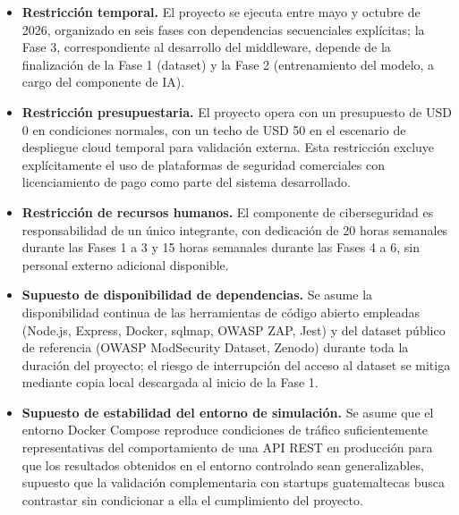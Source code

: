 \begin{itemize}
    \item \textbf{Restricción temporal.} El proyecto se ejecuta entre mayo y octubre de 2026,
    organizado en seis fases con dependencias secuenciales explícitas; la Fase 3, correspondiente
    al desarrollo del middleware, depende de la finalización de la Fase 1 (dataset) y la Fase 2
    (entrenamiento del modelo, a cargo del componente de IA).
    \item \textbf{Restricción presupuestaria.} El proyecto opera con un presupuesto de USD 0 en
    condiciones normales, con un techo de USD 50 en el escenario de despliegue cloud temporal
    para validación externa. Esta restricción excluye explícitamente el uso de plataformas de
    seguridad comerciales con licenciamiento de pago como parte del sistema desarrollado.
    \item \textbf{Restricción de recursos humanos.} El componente de ciberseguridad es
    responsabilidad de un único integrante, con dedicación de 20 horas semanales durante las
    Fases 1 a 3 y 15 horas semanales durante las Fases 4 a 6, sin personal externo adicional
    disponible.
    \item \textbf{Supuesto de disponibilidad de dependencias.} Se asume la disponibilidad
    continua de las herramientas de código abierto empleadas (Node.js, Express, Docker,
    sqlmap, OWASP ZAP, Jest) y del dataset público de referencia (OWASP ModSecurity Dataset,
    Zenodo) durante toda la duración del proyecto; el riesgo de interrupción del acceso al
    dataset se mitiga mediante copia local descargada al inicio de la Fase 1.
    \item \textbf{Supuesto de estabilidad del entorno de simulación.} Se asume que el entorno
    Docker Compose reproduce condiciones de tráfico suficientemente representativas del
    comportamiento de una API REST en producción para que los resultados obtenidos en el
    entorno controlado sean generalizables, supuesto que la validación complementaria con
    startups guatemaltecas busca contrastar sin condicionar a ella el cumplimiento del proyecto.
\end{itemize}


